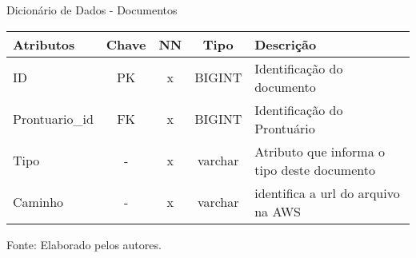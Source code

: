 \documentclass[
    12pt,               %
    openright,          %
    oneside,
    a4paper,            %
    BIBLATEX,           %
    TODO,               %
    english,            %
    brazil              %
    ]{ifsp-spo-inf-ctds}
\begin{document}
                    \begin{center}
                        \begin{quadro}[H]
                        \centering
                            \caption{Dicionário de Dados - Documentos}
                            \begin{tabulary}{1.0\textwidth}{|p{9em}|c|c|c|p{19em}|}
                          \hline
                          Atributos & Chave & NN & Tipo & Descrição\\
                          \hline
                          ID & PK & x & BIGINT & Identificação do documento \\
                          \hline
                          Prontuario\_id & FK & x & BIGINT & Identificação do Prontuário \\
                          \hline
                          Tipo & - & x & varchar & Atributo que informa o tipo deste documento \\
                          \hline
                          Caminho & - & x & varchar & identifica a url do arquivo na AWS\\
                          \hline
                          \end{tabulary}
                           
                            \label{qd: md-documento}
                            \centering
                          {\footnotesize Fonte: Elaborado pelos autores.}
                        \end{quadro}
                      \end{center} 
\end{document}

